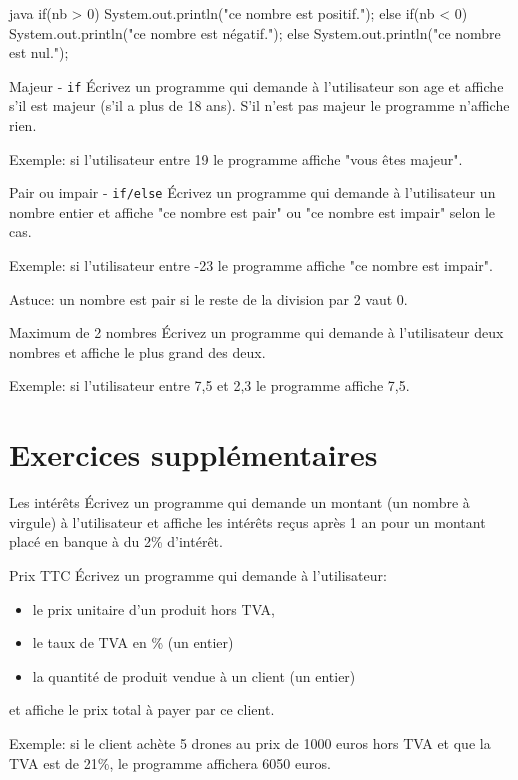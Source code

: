 \documentclass[a4paper,11pt]{article}
\begin{document}
	\begin{Code}{java}
		if(nb > 0) {
			System.out.println("ce nombre est positif.");
		} else if(nb < 0) {
			System.out.println("ce nombre est négatif.");
		} else {
			System.out.println("ce nombre est nul.");
		}
	\end{Code}

	
	\begin{Exercice}{Majeur - \texttt{if}}
		\'Ecrivez un programme qui demande à l'utilisateur 
		son age et affiche s'il est majeur (s'il a plus de 18 ans). 
		S'il n'est pas majeur le programme n'affiche rien.
		
		Exemple: si l'utilisateur entre 19 le programme affiche "vous êtes majeur". 
	\end{Exercice}

	\begin{Exercice}{Pair ou impair - \texttt{if/else}}
		\'Ecrivez un programme qui demande à l'utilisateur 
		un nombre entier et affiche "ce nombre est pair" ou "ce nombre est impair" selon le cas.
				
		Exemple: si l'utilisateur entre -23 le programme affiche "ce nombre est impair". 

		Astuce: un nombre est pair si le reste de la division par 2 vaut 0.
	\end{Exercice}

	\begin{Exercice}{Maximum de 2 nombres}
		\'Ecrivez un programme qui demande à l'utilisateur deux nombres
		et affiche le plus grand des deux.
		
		Exemple: si l'utilisateur entre 7,5 et 2,3 le programme affiche 7,5. 
	\end{Exercice}
	
	
	
\section{Exercices supplémentaires}




	\begin{Exercice}{Les intérêts}
		\'Ecrivez un programme qui demande un montant (un nombre à virgule)
		à l'utilisateur et affiche les intérêts reçus après 1 an pour un montant placé en banque à du 2\% d'intérêt.
	\end{Exercice}

	\begin{Exercice}{Prix TTC}
		\'Ecrivez un programme qui demande à l'utilisateur:
		\begin{itemize}
			\item le prix unitaire d’un produit hors TVA, 
			\item le taux de TVA en \% (un entier) 
			\item la quantité de produit vendue à un client (un entier)
		\end{itemize}
		et affiche le prix total à payer par ce client.
		
		Exemple: si le client achète 5 drones au prix de 1000 euros hors TVA et que la TVA est de 21\%,
				le programme affichera 6050 euros.
	\end{Exercice}
\end{document}
